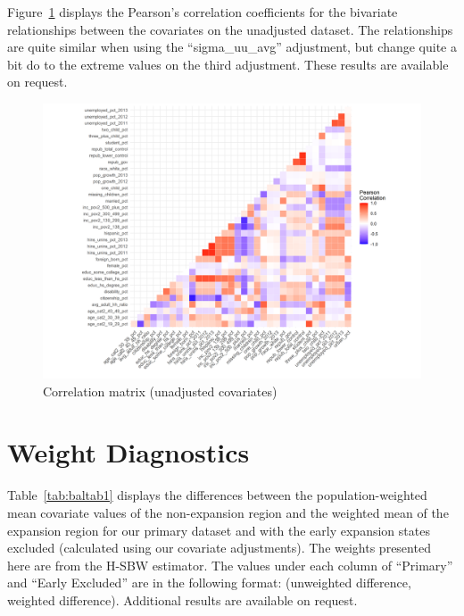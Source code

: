 \documentclass[aoas]{imsart}
\theoremstyle{plain}
\theoremstyle{remark}
\begin{document}
\begin{appendix}
Figure~\ref{fig:corrmatrix} displays the Pearson's correlation coefficients for the bivariate relationships between the covariates on the unadjusted dataset. The relationships are quite similar when using the ``sigma\_uu\_avg'' adjustment, but change quite a bit do to the extreme values on the third adjustment. These results are available on request.

\begin{figure}[]
\begin{center}
    \caption{Correlation matrix (unadjusted covariates)}
    \label{fig:corrmatrix}
    \includegraphics[scale=0.6]{01_Plots/correlation-plot-c1-sigma-zero.png}
\end{center}
\end{figure}

\section{Weight Diagnostics}
\label{ssec:balancetables}

Table~\ref{tab:baltab1} displays the differences between the population-weighted mean covariate values of the non-expansion region and the weighted mean of the expansion region for our primary dataset and with the early expansion states excluded (calculated using our covariate adjustments). The weights presented here are from the H-SBW estimator. The values under each column of ``Primary'' and ``Early Excluded'' are in the following format: (unweighted difference, weighted difference). Additional results are available on request.


\end{appendix}
\end{document}
